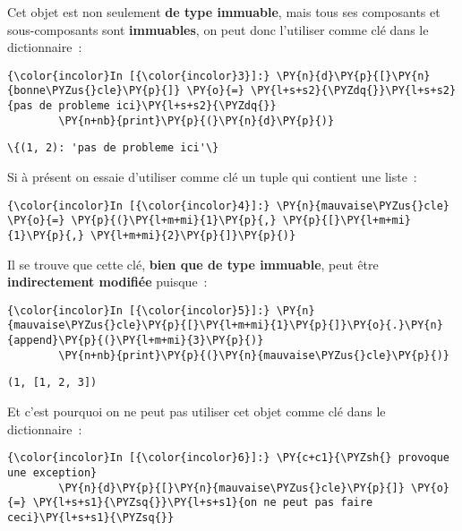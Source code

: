     Cet objet est non seulement \textbf{de type immuable}, mais tous ses
composants et sous-composants sont \textbf{immuables}, on peut donc
l'utiliser comme clé dans le dictionnaire~:

    \begin{Verbatim}[commandchars=\\\{\}]
{\color{incolor}In [{\color{incolor}3}]:} \PY{n}{d}\PY{p}{[}\PY{n}{bonne\PYZus{}cle}\PY{p}{]} \PY{o}{=} \PY{l+s+s2}{\PYZdq{}}\PY{l+s+s2}{pas de probleme ici}\PY{l+s+s2}{\PYZdq{}}
        \PY{n+nb}{print}\PY{p}{(}\PY{n}{d}\PY{p}{)}
\end{Verbatim}


    \begin{Verbatim}[commandchars=\\\{\}]
\{(1, 2): 'pas de probleme ici'\}

    \end{Verbatim}

    Si à présent on essaie d'utiliser comme clé un tuple qui contient une
liste~:

    \begin{Verbatim}[commandchars=\\\{\}]
{\color{incolor}In [{\color{incolor}4}]:} \PY{n}{mauvaise\PYZus{}cle} \PY{o}{=} \PY{p}{(}\PY{l+m+mi}{1}\PY{p}{,} \PY{p}{[}\PY{l+m+mi}{1}\PY{p}{,} \PY{l+m+mi}{2}\PY{p}{]}\PY{p}{)}
\end{Verbatim}


    Il se trouve que cette clé, \textbf{bien que de type immuable}, peut
être \textbf{indirectement modifiée} puisque~:

    \begin{Verbatim}[commandchars=\\\{\}]
{\color{incolor}In [{\color{incolor}5}]:} \PY{n}{mauvaise\PYZus{}cle}\PY{p}{[}\PY{l+m+mi}{1}\PY{p}{]}\PY{o}{.}\PY{n}{append}\PY{p}{(}\PY{l+m+mi}{3}\PY{p}{)}
        \PY{n+nb}{print}\PY{p}{(}\PY{n}{mauvaise\PYZus{}cle}\PY{p}{)}
\end{Verbatim}


    \begin{Verbatim}[commandchars=\\\{\}]
(1, [1, 2, 3])

    \end{Verbatim}

    Et c'est pourquoi on ne peut pas utiliser cet objet comme clé dans le
dictionnaire~:

    \begin{Verbatim}[commandchars=\\\{\}]
{\color{incolor}In [{\color{incolor}6}]:} \PY{c+c1}{\PYZsh{} provoque une exception}
        \PY{n}{d}\PY{p}{[}\PY{n}{mauvaise\PYZus{}cle}\PY{p}{]} \PY{o}{=} \PY{l+s+s1}{\PYZsq{}}\PY{l+s+s1}{on ne peut pas faire ceci}\PY{l+s+s1}{\PYZsq{}}
\end{Verbatim}


